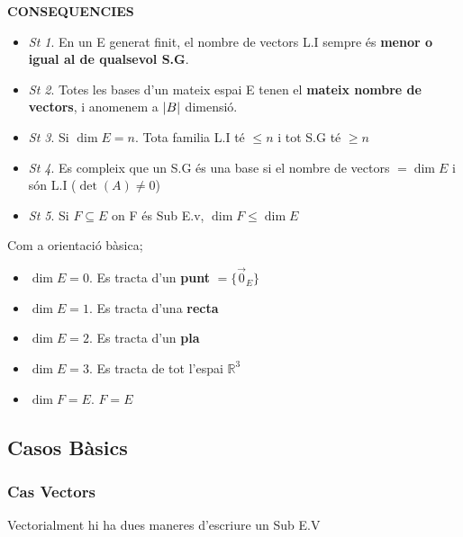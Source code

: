 \documentclass[12pt]{article}
\newcommand{\R}{\mathbb{R}}
\begin{document}
\textbf{CONSEQUENCIES}

\begin{itemize}
    \item \textit{St 1}. En un E generat finit, el nombre de vectors L.I sempre és \textbf{menor o igual al de qualsevol S.G}.
    \item \textit{St 2}. Totes les bases d'un mateix espai E tenen el \textbf{mateix nombre de vectors}, i anomenem a $\abs{B}$ dimensió.
    \item \textit{St 3}. Si \textbf{$\dim E = n$}. Tota familia L.I té $\leq n$ i tot S.G té $\geq n$
    \item \textit{St 4}. Es compleix que un S.G és una base si el nombre de vectors $= \dim E$ i són L.I ($\det(A) \neq 0$)
    \item \textit{St 5}. Si $F \subseteq E$ on F és Sub E.v, $\dim F \leq \dim E$
\end{itemize}

\begin{tcolorbox}[colback=black!1, colframe=black!55, boxrule=0.8pt, arc=2mm]
    \begin{center}
        Com a orientació bàsica;
        \begin{itemize}
            \item $\dim E = 0$. Es tracta d'un \textbf{punt} $= \{\vec{0}_E\}$
            \item $\dim E = 1$. Es tracta d'una \textbf{recta}
            \item $\dim E = 2$. Es tracta d'un \textbf{pla}
            \item $\dim E = 3$. Es tracta de tot l'espai \textbf{$\R^3$}
            \item $\dim F = E$. $F = E$
        \end{itemize}
    \end{center}
\end{tcolorbox}

\subsection{Casos Bàsics}

\subsubsection{Cas Vectors}

Vectorialment hi ha dues maneres d'escriure un Sub E.V
\end{document}
